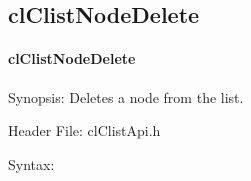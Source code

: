 \begin{flushleft}
\subsection{clClistNodeDelete}
\hypertarget{pagecl106}{}\paragraph{cl\-Clist\-Node\-Delete}\label{pagecl106}
\begin{Desc}
\item[Synopsis:]Deletes a node from the list.\end{Desc}
\begin{Desc}
\item[Header File:]clClistApi.h\end{Desc}
\begin{Desc}
\item[Syntax:]


\end{Desc}
\end{flushleft}
